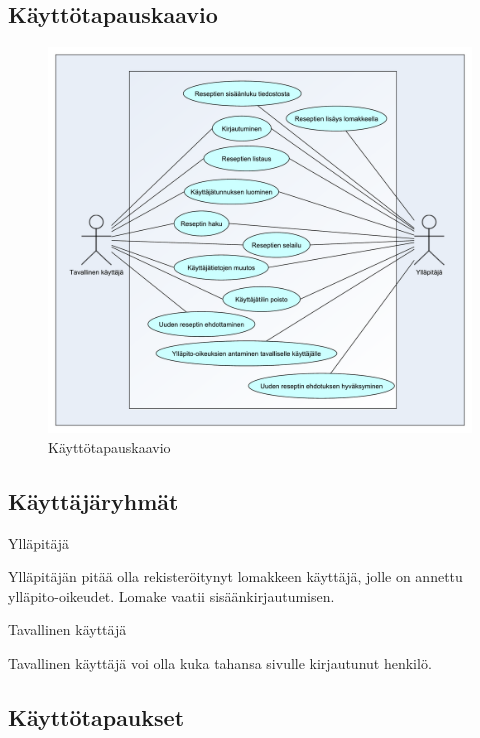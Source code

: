 \documentclass[a4paper]{article}
\begin{document}
\subsection{Käyttötapauskaavio}
\begin{figure}[h]
	\centering
	\includegraphics[scale=0.4]{kayttotapaukset.pdf}
	\caption{Käyttötapauskaavio}
\end{figure}
	
\subsection{Käyttäjäryhmät}

\begin{flushleft}Ylläpitäjä\end{flushleft}

Ylläpitäjän pitää olla rekisteröitynyt lomakkeen käyttäjä, jolle on annettu ylläpito-oikeudet. Lomake vaatii sisäänkirjautumisen.

\begin{flushleft}Tavallinen käyttäjä\end{flushleft}

Tavallinen käyttäjä voi olla kuka tahansa sivulle kirjautunut henkilö. 

\subsection{Käyttötapaukset}
\end{document}
